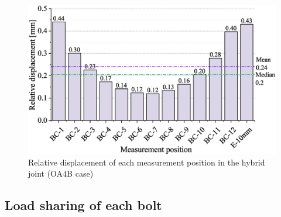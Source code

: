 \begin{figure}
\centering
    \includegraphics[width=0.9\linewidth]{imgs/ch7/RD-distri-oa4b.eps}
    \caption{Relative displacement of each measurement position in the hybrid joint (OA4B case)}
    \label{rd-distri}
\end{figure}


\subsection{Load sharing of each bolt}
\label{LS}



